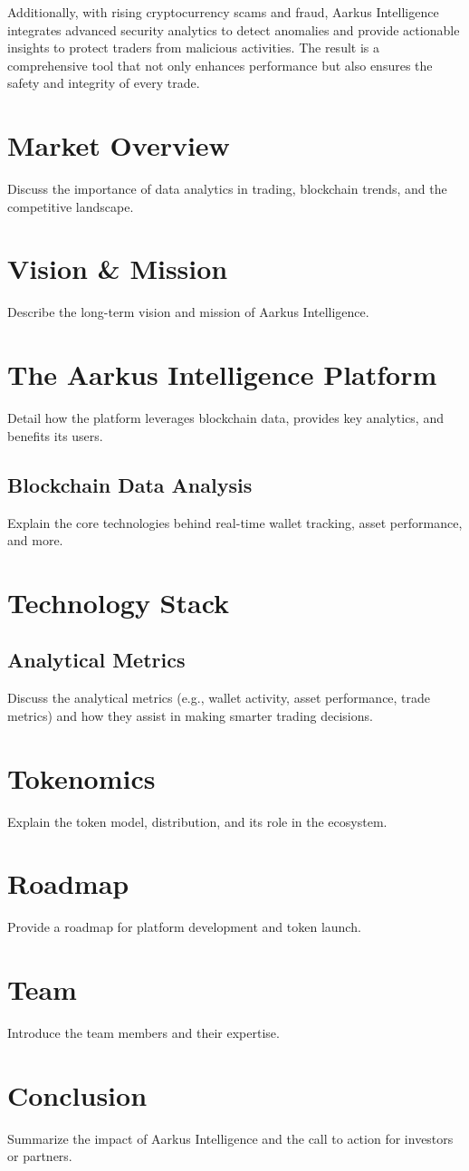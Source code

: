 \documentclass{article}
\begin{document}
Additionally, with rising cryptocurrency scams and fraud, Aarkus Intelligence integrates advanced security analytics to detect anomalies and provide actionable insights to protect traders from malicious activities. The result is a comprehensive tool that not only enhances performance but also ensures the safety and integrity of every trade.

\section{Market Overview}
Discuss the importance of data analytics in trading, blockchain trends, and the competitive landscape.

\section{Vision \& Mission}
Describe the long-term vision and mission of Aarkus Intelligence.

\section{The Aarkus Intelligence Platform}
Detail how the platform leverages blockchain data, provides key analytics, and benefits its users.

\subsection{Blockchain Data Analysis}
Explain the core technologies behind real-time wallet tracking, asset performance, and more.

\section{Technology Stack}
\subsection{Analytical Metrics}
Discuss the analytical metrics (e.g., wallet activity, asset performance, trade metrics) and how they assist in making smarter trading decisions.

\section{Tokenomics}
Explain the token model, distribution, and its role in the ecosystem.

\section{Roadmap}
Provide a roadmap for platform development and token launch.

\section{Team}
Introduce the team members and their expertise.

\section{Conclusion}
Summarize the impact of Aarkus Intelligence and the call to action for investors or partners.
\end{document}

